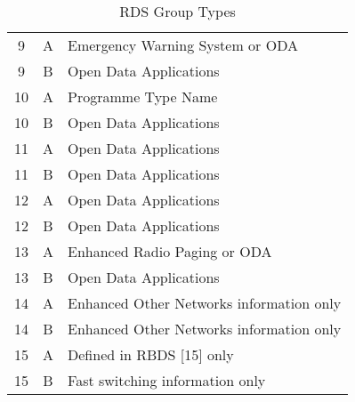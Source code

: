 \begin{table}[h]
\begin{center}
\begin{tabular}{ c c l }
		 9 & A & Emergency Warning System or ODA \\
		 9 & B & Open Data Applications\\
		10 & A & Programme Type Name\\
		10 & B & Open Data Applications\\
		11 & A & Open Data Applications\\
		11 & B & Open Data Applications\\
		12 & A & Open Data Applications\\
		12 & B & Open Data Applications\\
		13 & A & Enhanced Radio Paging or ODA\\
		13 & B & Open Data Applications\\
		14 & A & Enhanced Other Networks information only \\
		14 & B & Enhanced Other Networks information only \\
		15 & A & Defined in RBDS [15] only\\
		15 & B & Fast switching information only \\\hline
		\end{tabular}
		\caption{RDS Group Types}
		\label{tab:rds_groups}
	\end{center}
\end{table}




